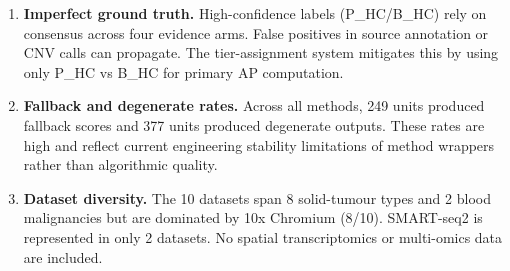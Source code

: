 \documentclass[10pt]{article}
\providecommand{\DIFaddtex}[1]{{\protect\color{trackgreen}#1}} %
\providecommand{\DIFdeltex}[1]{{\protect\color{red}\sout{#1}}}                      %
\providecommand{\DIFaddbegin}{} %
\providecommand{\DIFaddend}{} %
\providecommand{\DIFdelbegin}{} %
\providecommand{\DIFdelend}{} %
\providecommand{\DIFadd}[1]{\texorpdfstring{\DIFaddtex{#1}}{#1}} %
\providecommand{\DIFdel}[1]{\texorpdfstring{\DIFdeltex{#1}}{}} %
\newcommand{\DIFscaledelfig}{0.5}
\newlength{\DIFdelgraphicswidth} %
\newlength{\DIFdelgraphicsheight} %
\newcommand{\DIFaddincludegraphics}[2][]{{\color{trackgreen}\fbox{\DIFOincludegraphics[#1]{#2}}}} %
\newcommand{\DIFdelincludegraphics}[2][]{%
\sbox{\DIFdelgraphicsbox}{\DIFOincludegraphics[#1]{#2}}%
\settoboxwidth{\DIFdelgraphicswidth}{\DIFdelgraphicsbox} %
\settoboxtotalheight{\DIFdelgraphicsheight}{\DIFdelgraphicsbox} %
\scalebox{\DIFscaledelfig}{%
\parbox[b]{\DIFdelgraphicswidth}{\usebox{\DIFdelgraphicsbox}\\[-\baselineskip] \rule{\DIFdelgraphicswidth}{0em}}\llap{\resizebox{\DIFdelgraphicswidth}{\DIFdelgraphicsheight}{%
\setlength{\unitlength}{\DIFdelgraphicswidth}%
\begin{picture}(1,1)%
\thicklines\linethickness{2pt} %
{\color[rgb]{1,0,0}\put(0,0){\framebox(1,1){}}}%
{\color[rgb]{1,0,0}\put(0,0){\line( 1,1){1}}}%
{\color[rgb]{1,0,0}\put(0,1){\line(1,-1){1}}}%
\end{picture}%
}\hspace*{3pt}}} %
} %
\DeclareRobustCommand{\DIFaddbegin}{\DIFOaddbegin \let\includegraphics\DIFaddincludegraphics} %
\DeclareRobustCommand{\DIFaddend}{\DIFOaddend \let\includegraphics\DIFOincludegraphics} %
\DeclareRobustCommand{\DIFdelbegin}{\DIFOdelbegin \let\includegraphics\DIFdelincludegraphics} %
\DeclareRobustCommand{\DIFdelend}{\DIFOaddend \let\includegraphics\DIFOincludegraphics} %
\begin{document}
\begin{enumerate}
{  discriminated source-annotated malignant from non-malignant cells with
  overall AUROC }\DIFaddend = \DIFdelbegin \DIFdel{$-0.140$}\DIFdelend \DIFaddbegin \DIFadd{0.782 and MCC = 0.361. Per-dataset AUROC ranged from
  0.747 (hcc\_wei) to 0.960 (luad\_laughney), with five datasets
  exceeding 0.86 (luad\_laughney 0.960, pdac\_peng 0.934, crc\_lee
  0.892, hnscc\_puram 0.906, ov\_izar\_tirosh 0.868). An earlier version
  of this analysis reported hnscc\_puram at AUROC = 0.500 because its
  }\texttt{\DIFadd{cell\_type}} \DIFadd{labels (e.g.~}\texttt{\DIFadd{"0.0"}}\DIFaddend ,
  \DIFdelbegin \DIFdel{BH FDR }\DIFdelend \DIFaddbegin \texttt{\DIFadd{"Fibroblast"}}\DIFadd{, }\texttt{\DIFadd{"T\ cell"}}\DIFadd{) did not match infercnvpy's
  default reference categories (}\texttt{\DIFadd{T\ cells}}\DIFadd{, }\texttt{\DIFadd{B\ cells}}\DIFadd{,
  }\texttt{\DIFadd{Myeloids}}\DIFadd{, \ldots) and CNV scores were zero; we corrected the
  reference categories to include the singular label forms present in
  this dataset and regenerated its CNV, yielding AUROC }\DIFaddend = \DIFdelbegin \DIFdel{$6.1 \times 10^{-8}$; Cliff’s $\delta = -0.245$) ; this is reported under the exploratoryversus published category, not under the primary ranked method category \mbox{%
\cite{sh2022casee}}\hskip0pt%
.
}\DIFdelend \DIFaddbegin \DIFadd{0.906 (MCC =
  0.763). CNV is therefore used as one of three independent HC-label
  components, not as a standalone ground truth. Cross-validation with
  CopyKAT, Numbat, or SCEVAN would further strengthen CNV evidence but
  was not feasible at this scale.
}\item
  \textbf{\DIFadd{Imperfect ground truth.}} \DIFadd{High-confidence labels (P\_HC/B\_HC)
  rely on consensus across four evidence arms. False positives in source
  annotation or CNV calls can propagate. The tier-assignment system
  mitigates this by using only P\_HC vs B\_HC for primary AP
  computation.
}\item
  \textbf{\DIFadd{Fallback and degenerate rates.}} \DIFadd{Across all methods, 249 units
  produced fallback scores and 377 units produced degenerate outputs.
  These rates are high and reflect current engineering stability
  limitations of method wrappers rather than algorithmic quality.
}\item
  \textbf{\DIFadd{Dataset diversity.}} \DIFadd{The 10 datasets span 8 solid-tumour types
  and 2 blood malignancies but are dominated by 10x Chromium (8/10).
  SMART-seq2 is represented in only 2 datasets. No spatial
  transcriptomics or multi-omics data are included.
}
\end{enumerate}
\end{document}
